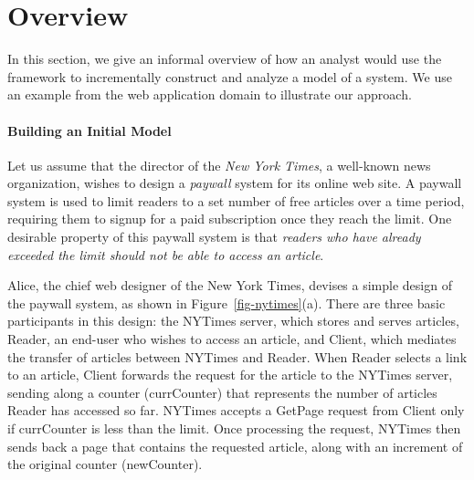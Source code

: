 
\section {Overview}
\label{sec-overview}

In this section, we give an informal overview of how an analyst would
use the framework to incrementally construct and analyze a model of a
system. We use an example from the web application domain to
illustrate our approach.

\paragraph{\textbf{Building an Initial Model}} Let us assume that the
director of the \textit{New York Times}, a well-known news
organization, wishes to design a \textit{paywall} system for its
online web site. A paywall system is used to limit readers to a set
number of free articles over a time period, requiring them to signup
for a paid subscription once they reach the limit.  One
desirable property of this paywall system is that \textit{readers who
  have already exceeded the limit should not be able to access an
  article}.

Alice, the chief web designer of the New York Times, devises a simple
design of the paywall system, as shown in
Figure~\ref{fig-nytimes}(a). There are three basic participants in this
design: the \textsf{NYTimes} server, which stores and serves articles,
\textsf{Reader}, an end-user who wishes to access an article, and
\textsf{Client}, which mediates the transfer of articles between
\textsf{NYTimes} and \textsf{Reader}. When \textsf{Reader} selects a
link to an article, \textsf{Client} forwards the request for the
article to the \textsf{NYTimes} server, sending along a counter
(\textsf{currCounter}) that represents the number of articles
\textsf{Reader} has accessed so far. \textsf{NYTimes} accepts a
 \textsf{GetPage} request from \textsf{Client} only if
\textsf{currCounter} is less than the limit. Once processing the
request, \textsf{NYTimes} then sends back a page that contains the
requested article, along with an increment of the original counter
(\textsf{newCounter}).

